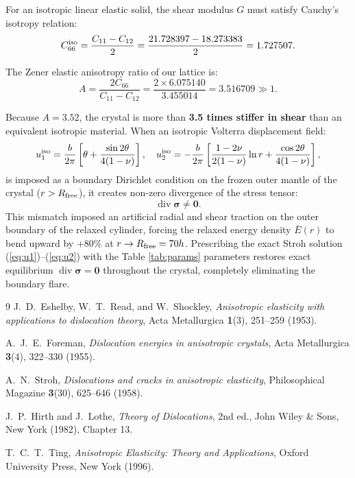 \documentclass[11pt,a4paper]{article}
\begin{document}
For an isotropic linear elastic solid, the shear modulus $G$ must satisfy Cauchy's isotropy relation:
\begin{equation}
C_{66}^{\rm iso} = \frac{C_{11} - C_{12}}{2} = \frac{21.728397 - 18.273383}{2} = 1.727507.
\end{equation}

The Zener elastic anisotropy ratio of our lattice is:
\begin{equation}
A = \frac{2 C_{66}}{C_{11} - C_{12}} = \frac{2 \times 6.075140}{3.455014} = 3.516709 \gg 1.
\end{equation}

Because $A = 3.52$, the crystal is more than \textbf{3.5 times stiffer in shear} than an equivalent isotropic material. When an isotropic Volterra displacement field:
\begin{equation}
u_1^{\rm iso} = \frac{b}{2\pi} \left[ \theta + \frac{\sin 2\theta}{4(1-\nu)} \right], \quad
u_2^{\rm iso} = -\frac{b}{2\pi} \left[ \frac{1-2\nu}{2(1-\nu)} \ln r + \frac{\cos 2\theta}{4(1-\nu)} \right],
\end{equation}
is imposed as a boundary Dirichlet condition on the frozen outer mantle of the crystal ($r > R_{\rm free}$), it creates non-zero divergence of the stress tensor:
\begin{equation}
\operatorname{div}\bm{\sigma} \neq \bm{0}.
\end{equation}
This mismatch imposed an artificial radial and shear traction on the outer boundary of the relaxed cylinder, forcing the relaxed energy density $\bar{E}(r)$ to bend upward by $+80\%$ at $r \to R_{\rm free} = 70h$. Prescribing the exact Stroh solution (\ref{eq:u1})--(\ref{eq:u2}) with the Table \ref{tab:params} parameters restores exact equilibrium $\operatorname{div}\bm{\sigma} = \bm{0}$ throughout the crystal, completely eliminating the boundary flare.

\begin{thebibliography}{9}
J.~D.~Eshelby, W.~T.~Read, and W.~Shockley,
\textit{Anisotropic elasticity with applications to dislocation theory},
Acta Metallurgica \textbf{1}(3), 251--259 (1953).

A.~J.~E.~Foreman,
\textit{Dislocation energies in anisotropic crystals},
Acta Metallurgica \textbf{3}(4), 322--330 (1955).

A.~N.~Stroh,
\textit{Dislocations and cracks in anisotropic elasticity},
Philosophical Magazine \textbf{3}(30), 625--646 (1958).

J.~P.~Hirth and J.~Lothe,
\textit{Theory of Dislocations}, 2nd ed.,
John Wiley \& Sons, New York (1982), Chapter 13.

T.~C.~T.~Ting,
\textit{Anisotropic Elasticity: Theory and Applications},
Oxford University Press, New York (1996).
\end{thebibliography}
\end{document}
